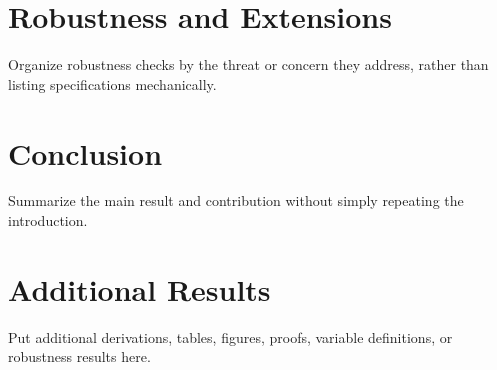 \documentclass[11pt]{article}                 %
\begin{document}
\section{Robustness and Extensions}\label{sec:robustness}

Organize robustness checks by the threat or concern they address, rather than listing specifications mechanically.

\section{Conclusion}\label{sec:conclusion}

Summarize the main result and contribution without simply repeating the introduction.


%

\clearpage                                    %
\appendix                                     %

\section{Additional Results}\label{app:additional}

Put additional derivations, tables, figures, proofs, variable definitions, or robustness results here.
\end{document}

